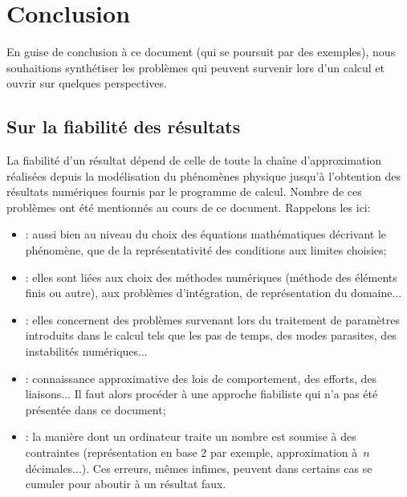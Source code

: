 \chapter*{Conclusion}\label{Ch-Ccl}

En guise de conclusion à ce document (qui se poursuit par des exemples), nous souhaitions synthétiser les problèmes qui peuvent survenir lors d'un calcul et ouvrir sur quelques perspectives.


\medskip
\section*{Sur la fiabilité des résultats}

La fiabilité d'un résultat dépend de celle de toute la chaîne d'approximation réalisées depuis la modélisation du phénomènes physique jusqu'à l'obtention des résultats numériques fournis par le programme de calcul. Nombre de ces problèmes ont été mentionnés au cours de ce document. Rappelons les ici:
\begin{itemize}
  \item {}: aussi bien au niveau du choix des équations mathématiques décrivant le phénomène, que de la représentativité des conditions aux limites choisies;
  \item {}: elles sont liées aux choix des méthodes numériques (méthode des éléments finis ou autre), aux problèmes d'intégration, de représentation du domaine...
  \item {}: elles concernent des problèmes survenant lors du traitement de paramètres introduits dans le calcul tels que les pas de temps, des modes parasites, des instabilités numériques...
  \item {}: connaissance approximative des lois de comportement, des efforts, des liaisons... Il faut alors procéder à une approche fiabiliste qui n'a pas été présentée dans ce document;
  \item {}: la manière dont un ordinateur traite un nombre est soumise à des contraintes (représentation en base 2 par exemple, approximation à~$n$ décimales...). Ces erreurs, mêmes infimes, peuvent dans certains cas se cumuler pour aboutir à un résultat faux.
\end{itemize}

